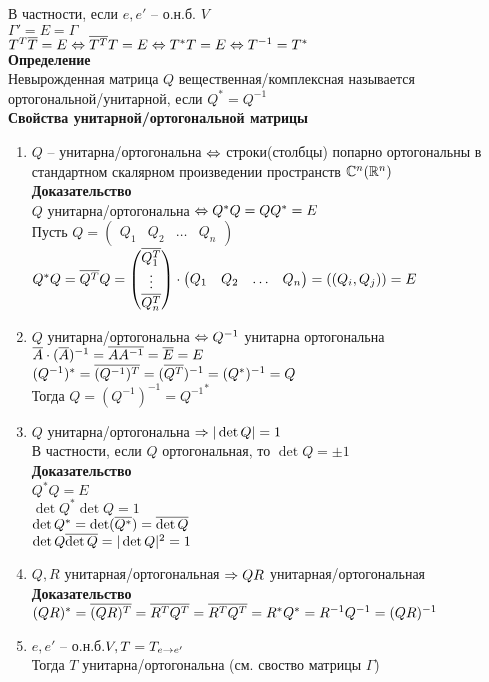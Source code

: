 \documentclass[12pt]{article}
\begin{document}
В частности, если $e, e'$ -- о.н.б. $V$\\
$\Gamma' = E = \Gamma$\\
$T^T \overline T = E \Leftrightarrow \overline{T^T}T = E \Leftrightarrow T^*T = E \Leftrightarrow T^{-1} = T^*$\\
\textbf{Определение}\\
Невырожденная матрица $Q$ вещественная/комплексная называется ортогональной/унитарной, если $Q^* = Q^{-1}$\\
\textbf{Свойства унитарной/ортогональной матрицы}
\begin{enumerate}
    \item $Q$ -- унитарна/ортогональна $\Leftrightarrow$ строки(столбцы) попарно ортогональны в стандартном скалярном произведении пространств $\mathbb{C}^n(\mathbb{R}^n)$\\
    \textbf{Доказательство}\\
    $Q$ унитарна/ортогональна $\Leftrightarrow Q^*Q = QQ^* = E$\\
    Пусть $Q = \begin{pmatrix}
        Q_1 & Q_2 & \ldots & Q_n
    \end{pmatrix}$\\
    $Q^*Q = \overline{Q^T}Q = \begin{pmatrix}
        \overline{Q_1^T}\\
        \vdots\\
        \overline{Q_n^T}
    \end{pmatrix}\cdot \begin{pmatrix}
        Q_1 & Q_2 & \ldots & Q_n
    \end{pmatrix} = ((Q_i, Q_j)) = E$
    \item $Q$ унитарна/ортогональна $\Leftrightarrow Q^{-1}$ унитарна ортогональна\\
    $\overline A \cdot (\overline{A})^{-1}=\overline{AA^{-1}} = \overline E = E$\\
    $(Q^{-1})^* = \overline{(Q^{-1})^T}= (\overline{Q^T})^{-1} = (Q^*)^{-1} = Q$\\
    Тогда $Q = (Q^{-1})^{-1} = {Q^{-1}}^*$
    \item $Q$ унитарна/ортогональна $\Rightarrow |\det Q| = 1$\\
    В частности, если $Q$ ортогональная, то $\det Q = \pm 1$\\
    \textbf{Доказательство}\\
    $Q^*Q = E$\\
    $\det Q^* \det Q = 1$\\
    $\det Q^* = \det(\overline{Q^*}) = \overline{\det Q}$\\
    $\det Q \overline{\det Q} = |\det Q|^2 = 1$
    \item $Q, R$ унитарная/ортогональная $\Rightarrow QR$ унитарная/ортогональная\\
    \textbf{Доказательство}\\
    $(QR)^* = \overline{(QR)^T} = \overline {R^TQ^T} = \overline{R^T}\overline{Q^T} = R^*Q^* = R^{-1}Q^{-1}=(QR)^{-1}$
    \item $e,e'$ -- о.н.б.$V, T = T_{e\rightarrow e'}$\\
    Тогда $T$ унитарна/ортогональна (см. своство матрицы $\Gamma$)
\end{enumerate}
\end{document}
